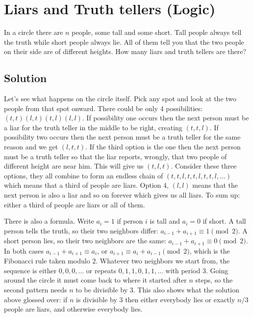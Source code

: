 \section{Liars and Truth tellers (Logic)}
In a circle there are $n$ people, some tall and some short. Tall people always tell the truth while short people always lie. All of them tell you that the two people on their side are of different heights. How many liars and truth tellers are there?

\subsection{Solution}
Let's see what happens on the circle itself. Pick any spot and look at the two people from that spot onward. There could be only 4 possibilities: $(t,t) (l,t) (t,l) (l,l)$. If possibility one occurs then the next person must be a liar for the truth teller in the middle to be right, creating $(t,t,l)$. If possibility two occurs then the next person must be a truth teller for the same reason and we get $(l,t,t)$. If the third option is the one then the next person must be a truth teller so that the liar reports, wrongly, that two people of different height are near him. This will give us $(t,l,t)$. Consider these three options, they all combine to form an endless chain of $(t,t,l,t,t,l,t,t,l,\ldots)$ which means that a third of people are liars. Option 4, $(l,l)$ means that the next person is also a liar and so on forever which gives us all liars. To sum up: either a third of people are liars or all of them.

There is also a formula. Write $a_i=1$ if person $i$ is tall and $a_i=0$ if short. A tall person tells the
truth, so their two neighbors differ: $a_{i-1}+a_{i+1}\equiv1 \pmod 2$. A short person lies, so their two
neighbors are the same: $a_{i-1}+a_{i+1}\equiv0 \pmod 2$. In both cases $a_{i-1}+a_{i+1}\equiv a_i$, or
$a_{i+1}\equiv a_i+a_{i-1} \pmod 2$, which is the Fibonacci rule taken modulo $2$. Whatever two neighbors we
start from, the sequence is either $0,0,0,\ldots$ or repeats $0,1,1,0,1,1,\ldots$ with period $3$. Going
around the circle it must come back to where it started after $n$ steps, so the second pattern needs $n$ to
be divisible by $3$. This also shows what the solution above glossed over: if $n$ is divisible by $3$ then
either everybody lies or exactly $n/3$ people are liars, and otherwise everybody lies.
